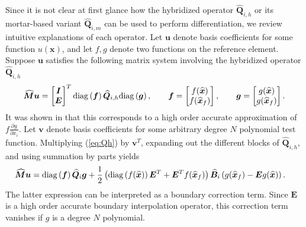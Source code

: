 \documentclass{svjour3}                     %
\renewcommand{\hat}{\widehat}
\newcommand{\diag}[1]{{\rm diag}\LRp{#1}}
\newcommand{\pd}[2]{\frac{\partial#1}{\partial#2}}
\newcommand{\LRp}[1]{\left( #1 \right)}
\begin{document}
Since it is not clear at first glance how the hybridized operator $\hat{\bm{Q}}_{i,h}$ or its mortar-based variant $\hat{\bm{Q}}_{i,m}$ can be used to perform differentiation, we review intuitive explanations of each operator.  Let $\bm{u}$ denote basis coefficients for some function $u(\bm{x})$, and let $f, g$ denote two functions on the reference element.  Suppose $\bm{u}$ satisfies the following matrix system involving the hybridized operator $\hat{\bm{Q}}_{i,h}$
\begin{align}
\hat{\bm{M}}\bm{u} = \begin{bmatrix}
\bm{I}\\
\bm{E}
\end{bmatrix}^T \diag{\bm{f}}\hat{\bm{Q}}_{i,h} \diag{\bm{g}}, \qquad \bm{f} = \begin{bmatrix} f(\hat{\bm{x}}) \\ f(\hat{\bm{x}}_f)\end{bmatrix}, \qquad \bm{g} = \begin{bmatrix} g(\hat{\bm{x}}) \\ g(\hat{\bm{x}}_f)\end{bmatrix}.
\label{eq:Qh}
\end{align}
It was shown in \cite{chan2017discretely, chan2019skew} that this corresponds to a high order accurate approximation of $f\pd{g}{x_i}$.  Let $\bm{v}$ denote basis coefficients for some arbitrary degree $N$ polynomial test function.  Multiplying (\ref{eq:Qh}) by $\bm{v}^T$, expanding out the different blocks of $\hat{\bm{Q}}_{i,h}$, and using summation by parts yields
\begin{align*}
\hat{\bm{M}}\bm{u} &= 
\diag{\bm{f}}\hat{\bm{Q}}_i\bm{g} + \frac{1}{2}\LRp{\diag{f(\hat{\bm{x}})}\bm{E}^T + \bm{E}^T f(\hat{\bm{x}}_f)}\hat{\bm{B}}_i \LRp{g(\hat{\bm{x}}_f) - \bm{E} g(\hat{\bm{x}})}.
\end{align*}
The latter expression can be interpreted as a boundary correction term.  Since $\bm{E}$ is a high order accurate boundary interpolation operator, this correction term vanishes if $g$ is a degree $N$ polynomial.  
\end{document}
